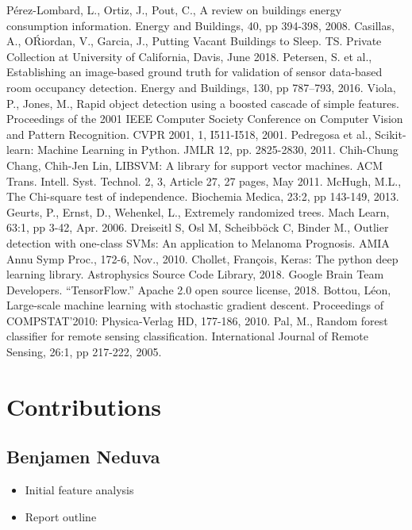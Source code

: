 \documentclass[letterpaper, 12 pt, conference]{ieeeconf}  %
\begin{document}
\begin{thebibliography}{99}

 Pérez-Lombard, L., Ortiz, J., Pout, C., A review on buildings energy consumption information. Energy and Buildings, 40, pp 394-398, 2008.
 Casillas, A., O{\' R}iordan, V., Garcia, J., Putting Vacant Buildings to Sleep. TS. Private Collection at University of California, Davis, June 2018.
 Petersen, S. et al., Establishing an image-based ground truth for validation of sensor data-based room occupancy detection. Energy and Buildings, 130, pp 787–793, 2016.
 Viola, P., Jones, M., Rapid object detection using a boosted cascade of simple features. Proceedings of the 2001 IEEE Computer Society Conference on Computer Vision and Pattern Recognition. CVPR 2001, 1, I511-I518, 2001. 
 Pedregosa et al., Scikit-learn: Machine Learning in Python. JMLR 12, pp. 2825-2830, 2011.
 Chih-Chung Chang, Chih-Jen Lin, LIBSVM: A library for support vector machines. ACM Trans. Intell. Syst. Technol. 2, 3, Article 27, 27 pages, May 2011.
 McHugh, M.L., The Chi-square test of independence. Biochemia Medica, 23:2, pp 143-149, 2013.
 Geurts, P., Ernst, D., Wehenkel, L., Extremely randomized trees. Mach Learn, 63:1, pp 3-42, Apr. 2006.
 Dreiseitl S, Osl M, Scheibb{\"o}ck C, Binder M., Outlier detection with one-class SVMs: An application to Melanoma Prognosis. AMIA Annu Symp Proc., 172-6, Nov., 2010.
 Chollet, Fran{\c c}ois, Keras: The python deep learning library. Astrophysics Source Code Library, 2018.
 Google Brain Team Developers. “TensorFlow.” Apache 2.0 open source license, 2018.
 Bottou, L{\' e}on, Large-scale machine learning with stochastic gradient descent. Proceedings of COMPSTAT'2010: Physica-Verlag HD, 177-186, 2010.
 Pal, M., Random forest classifier for remote sensing classification. International Journal of Remote Sensing, 26:1, pp 217-222, 2005.




\end{thebibliography}

\section{Contributions}

\subsection*{Benjamen Neduva}
        \begin{itemize}
                \item Initial feature analysis
                \item Report outline
        \end{itemize}
\end{document}
